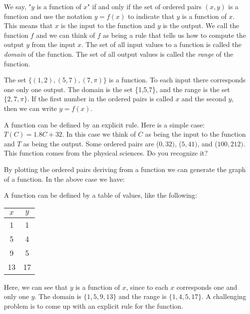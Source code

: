 We say, "$y$ is a function of $x$" if and only if the set of ordered pairs $(x,y)$ is a function and use the notation $ y=f(x) $ to indicate that $y$ is a function of $x$.  This means that $x$ is the input to the function and $y$ is the output.  We call the function $f$ and we can think of $f$ as being a rule that tells us how to compute the output $y$ from the input $x$. The set of all input values to a function is called the \emph{domain} of the function.  The set of all output values is called the \emph{range} of the function.

\begin{exm}{3}
The set $\{(1,2), (5,7), (7,\pi)\}$ is a function.  To each input there corresponds one only one output.  The domain is the set \{1,5,7\}, and the range is the set $\{2,7,\pi\}$.  If the first number in the ordered pairs is called $x$ and the second $y$, then we can write $y = f(x)$.
\end{exm}
\begin{exm}{4}
A function can be defined by an explicit rule.  Here is a simple case: $T(C) = 1.8C + 32$.  In this case we think of $C$ as being the input to the function and $T$ as being the output.  Some ordered pairs are ($0, 32)$, ($5, 41)$, and ($100, 212)$.  This function comes from the physical sciences.  Do you recognize it?
\end{exm}
\begin{exm}{5}
By plotting the ordered pairs deriving from a function we can generate the graph of a function.  In the above case we have:
\begin{center}
\end{center}
\end{exm}
\begin{exm}{6}
A function can be defined by a table of values, like the following:
\begin{center}
\begin{tabular}{|c|c|}
\hline 
$x$ & $y$ \\ 
\hline 
1 & 1 \\ 
\hline 
5 & 4 \\ 
\hline 
9 & 5 \\ 
\hline 
13 & 17 \\ 
\hline 
\end{tabular} 
\end{center}
Here, we can see that $y$ is a function of $x$, since to each $x$ corresponds one and only one $y$.  The domain is $\{1,5,9,13\}$ and the range is $\{1,4,5,17\}$.  A challenging problem is to come up with an explicit rule for the function.
\end{exm}
